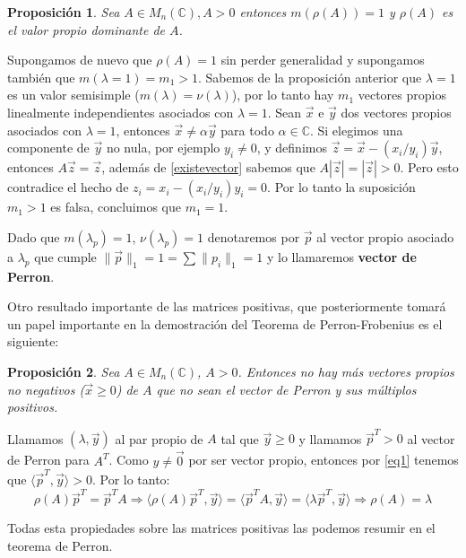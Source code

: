 \documentclass[size=a4, parskip=half, titlepage=false, toc=flat, toc=bib, 12pt]{scrartcl}
\makeatletter
\renewenvironment{proof}[1][\proofname] {\par\pushQED{\qed}\normalfont\topsep6\p@\@plus6\p@\relax\trivlist\item[\hskip\labelsep\itshape\tgpaella#1\@addpunct{.}]\ignorespaces}{\popQED\endtrivlist\@endpefalse}
\theoremstyle{theorem-style}
\newtheorem{nprop}{Proposición}[section]
\theoremstyle{definition-style}
\theoremstyle{remark-style}
\theoremstyle{example-style}
\theoremstyle{definition-style}
\theoremstyle{remark-style}
\makeatother
\begin{document}
\begin{nprop}
Sea $A \in M_n(\mathbb{C}), A > 0$ entonces $m(\rho(A))=1$ y $\rho(A)$ es el valor propio dominante de $A$.
\end{nprop}
\begin{proof}
Supongamos de nuevo que $\rho(A) = 1$ sin perder generalidad y supongamos también que $m(\lambda = 1) = m_1 > 1$. Sabemos de la proposición anterior que $\lambda = 1$ es un valor semisimple ($m(\lambda) = \nu(\lambda)$), por lo tanto hay $m_1$ vectores propios linealmente independientes asociados con $\lambda = 1$. Sean $\vec{x}$ e $\vec{y}$ dos vectores propios asociados con $\lambda = 1$, entonces $\vec{x} \neq \alpha \vec{y}$ para todo $\alpha \in \mathbb{C}$. Si elegimos una componente de $\vec{y}$ no nula, por ejemplo $y_i \neq 0$, y definimos $\vec{z} = \vec{x} - (x_i/y_i)\vec{y}$, entonces $A\vec{z} = \vec{z}$, además de \ref{existevector} sabemos que $A |\vec{z}| = |\vec{z}| >0$. Pero esto contradice el hecho de $z_i = x_i - (x_i/y_i)y_i = 0$. Por lo tanto la suposición $m_1 > 1$ es falsa, concluimos que $m_1 = 1$.
\end{proof}

Dado que $m(\lambda_p) = 1$, $\nu(\lambda_p) = 1$ denotaremos por $\vec{p}$ al vector propio asociado a $\lambda_p$ que cumple $\|\vec{p}\|_1 = 1 = \sum \|p_i\|_1 = 1$ y lo llamaremos \textbf{vector de Perron}.

Otro resultado importante de las matrices positivas, que posteriormente tomará un papel importante en la demostración del Teorema de Perron-Frobenius es el siguiente:

\begin{nprop}
\label{nomasvalores}
Sea $A \in M_n(\mathbb{C})$, $A> 0$. Entonces no hay más vectores propios no negativos ($\vec{x} \geq 0$) de $A$ que no sean el vector de Perron y sus múltiplos positivos.
\end{nprop}
\begin{proof}
Llamamos $(\lambda, \vec{y})$ al par propio de $A$ tal que $\vec{y} \geq 0$ y llamamos $\vec{p}^T > 0$ al vector de Perron para $A^T$. Como $y \neq \vec{0}$ por ser vector propio, entonces por \ref{eq1} tenemos que $\langle \vec{p}^T, \vec{y} \rangle> 0$. Por lo tanto:
$$\rho(A)\vec{p}^T = \vec{p}^T A \Rightarrow \langle \rho(A)\vec{p}^T, \vec{y} \rangle = \langle \vec{p}^TA, \vec{y} \rangle = \langle \lambda \vec{p}^T, \vec{y}\rangle \Rightarrow \rho(A) = \lambda $$
\end{proof}

Todas esta propiedades sobre las matrices positivas las podemos resumir en el teorema de Perron.
\end{document}
